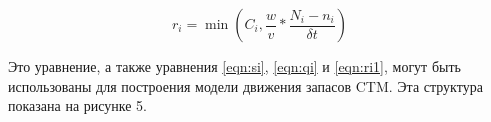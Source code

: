 \begin{equation}
    \label{eqn:ri1}
    r_i = \min(C_i, \frac{w}{v} * \frac{N_i − n_i}{δt})
\end{equation}


Это уравнение, а также уравнения \ref{eqn:si}, \ref{eqn:qi} и \ref{eqn:ri1}, могут быть использованы для построения модели движения запасов CTM. Эта структура показана на рисунке 5.

\clearpage